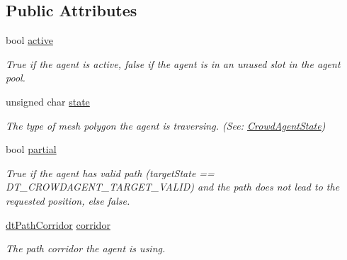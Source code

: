 \subsection*{Public Attributes}
\begin{DoxyCompactItemize}
\item 
\mbox{\label{structdtCrowdAgent_a6473f48354abf6f46f5b4d7ead9bca20}} 
bool \hyperlink{structdtCrowdAgent_a6473f48354abf6f46f5b4d7ead9bca20}{active}
\begin{DoxyCompactList}\small\item\em True if the agent is active, false if the agent is in an unused slot in the agent pool. \end{DoxyCompactList}\item 
\mbox{\label{structdtCrowdAgent_a091dd7851f63dbe00a59b54072152d5f}} 
unsigned char \hyperlink{structdtCrowdAgent_a091dd7851f63dbe00a59b54072152d5f}{state}
\begin{DoxyCompactList}\small\item\em The type of mesh polygon the agent is traversing. (See\+: \hyperlink{group__crowd_ga59bc9aa54705292d8f0f1ad9ca48ca82}{Crowd\+Agent\+State}) \end{DoxyCompactList}\item 
\mbox{\label{structdtCrowdAgent_aeb06d7c34ab74696ebb125b0c409043d}} 
bool \hyperlink{structdtCrowdAgent_aeb06d7c34ab74696ebb125b0c409043d}{partial}
\begin{DoxyCompactList}\small\item\em True if the agent has valid path (target\+State == D\+T\+\_\+\+C\+R\+O\+W\+D\+A\+G\+E\+N\+T\+\_\+\+T\+A\+R\+G\+E\+T\+\_\+\+V\+A\+L\+ID) and the path does not lead to the requested position, else false. \end{DoxyCompactList}\item 
\mbox{\label{structdtCrowdAgent_a65166bf21e82273168b4f6f4864044ef}} 
\hyperlink{classdtPathCorridor}{dt\+Path\+Corridor} \hyperlink{structdtCrowdAgent_a65166bf21e82273168b4f6f4864044ef}{corridor}
\begin{DoxyCompactList}\small\item\em The path corridor the agent is using. \end{DoxyCompactList}\item 
\mbox{\label{structdtCrowdAgent_a68fc2f237bd2ac88e4aed6afe6a77951}} 

\end{DoxyCompactItemize}
